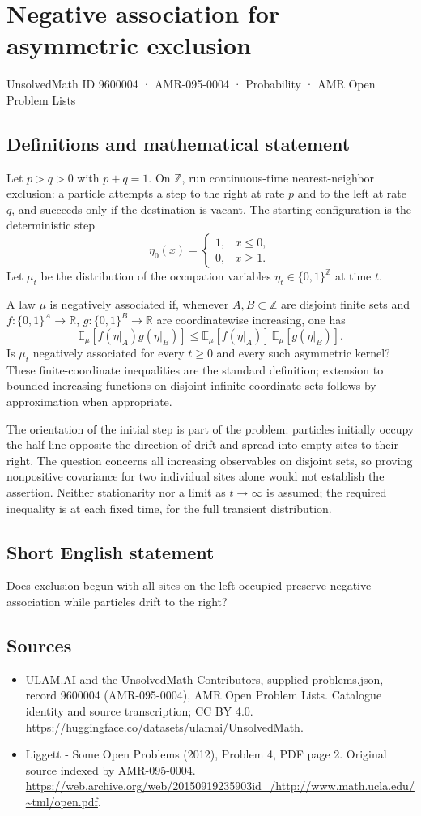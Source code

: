 \documentclass[11pt,a4paper]{article}
\begin{document}
\section*{Negative association for asymmetric exclusion}\label{9600004}
{\small UnsolvedMath ID 9600004 · AMR-095-0004 · Probability · AMR Open Problem Lists}
\subsection{Definitions and mathematical statement}
Let $p>q>0$ with $p+q=1$. On $\mathbb Z$, run continuous-time nearest-neighbor exclusion: a particle attempts a step to the right at rate $p$ and to the left at rate $q$, and succeeds only if the destination is vacant. The starting configuration is the deterministic step
\[
\eta_0(x)=\begin{cases}1,&x\le0,\\0,&x\ge1.\end{cases}
\]
Let $\mu_t$ be the distribution of the occupation variables $\eta_t\in\{0,1\}^{\mathbb Z}$ at time $t$.

A law $\mu$ is negatively associated if, whenever $A,B\subset\mathbb Z$ are disjoint finite sets and $f:\{0,1\}^A\to\mathbb R$, $g:\{0,1\}^B\to\mathbb R$ are coordinatewise increasing, one has
\[
\mathbb E_\mu[f(\eta|_A)g(\eta|_B)]
\le \mathbb E_\mu[f(\eta|_A)]\,
     \mathbb E_\mu[g(\eta|_B)].
\]
Is $\mu_t$ negatively associated for every $t\ge0$ and every such asymmetric kernel? These finite-coordinate inequalities are the standard definition; extension to bounded increasing functions on disjoint infinite coordinate sets follows by approximation when appropriate.

The orientation of the initial step is part of the problem: particles initially occupy the half-line opposite the direction of drift and spread into empty sites to their right. The question concerns all increasing observables on disjoint sets, so proving nonpositive covariance for two individual sites alone would not establish the assertion. Neither stationarity nor a limit as $t\to\infty$ is assumed; the required inequality is at each fixed time, for the full transient distribution.
\subsection{Short English statement}
Does exclusion begun with all sites on the left occupied preserve negative association while particles drift to the right?
\subsection{Sources}
\begin{itemize}
\item[S1] ULAM.AI and the UnsolvedMath Contributors, supplied problems.json, record 9600004 (AMR-095-0004), AMR Open Problem Lists. Catalogue identity and source transcription; CC BY 4.0.
\url{https://huggingface.co/datasets/ulamai/UnsolvedMath}.
\item[S2] Liggett - Some Open Problems (2012), Problem 4, PDF page 2. Original source indexed by AMR-095-0004.
\url{https://web.archive.org/web/20150919235903id_/http://www.math.ucla.edu/~tml/open.pdf}.
\end{itemize}
\end{document}
